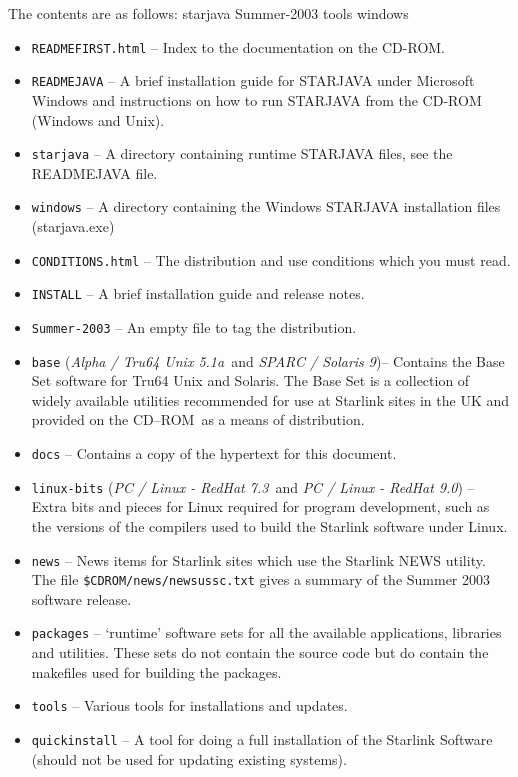\documentclass[twoside,11pt]{article}
\renewcommand{\_}{\texttt{\symbol{95}}}
\newcommand{\cdrom}{CD--ROM}
\newcommand{\cdrom}{CD-ROM}
\newcommand{\axp}{\textit{Alpha / Tru64 Unix 5.1a}}
\newcommand{\rha}{\textit{PC / Linux - RedHat 7.3}}
\newcommand{\rhb}{\textit{PC / Linux - RedHat 9.0}}
\newcommand{\sol}{\textit{SPARC / Solaris 9}}
\begin{document}
The contents are as follows:
starjava  Summer-2003  tools  windows
\begin{itemize}

\item \texttt{README\_FIRST.html} -- Index to the documentation on the CD-ROM.

\item \texttt{README\_JAVA} -- A brief installation guide for STARJAVA under
                               Microsoft Windows and instructions on how to
                               run STARJAVA from the CD-ROM (Windows and Unix).

\item \texttt{starjava} -- A directory containing runtime STARJAVA files, see 
                           the README\_JAVA file.

\item \texttt{windows} -- A directory containing the Windows STARJAVA installation 
                          files (starjava.exe) 

\item \texttt{CONDITIONS.html} -- The distribution and use conditions which
you must read.

\item \texttt{INSTALL} -- A brief installation guide and release notes.

\item \texttt{Summer-2003} -- An empty file to tag the distribution.

\item \texttt{base} (\axp\ and \sol)-- Contains the Base Set software
for Tru64 Unix and Solaris.  The Base Set is a collection of widely
available utilities recommended for use at Starlink sites in the UK and
provided on the \cdrom\ as a means of distribution.

\item \texttt{docs} -- Contains a copy of the hypertext for this document.

\item \texttt{linux-bits} (\rha\ and \rhb) -- Extra bits and pieces
for Linux required for program development, such as the versions of the
compilers used to build the Starlink software under Linux.

\item \texttt{news} -- News items for Starlink sites which use the
Starlink NEWS utility.  The file \texttt{\$CDROM/news/news\_ussc.txt}
gives a summary of the Summer 2003 software release.

\item \texttt{packages} -- `runtime' software sets for all the
available applications, libraries and utilities.  These sets do not
contain the source code but do contain the makefiles used for building
the packages.

\item \texttt{tools} -- Various tools for installations and updates.


\item \texttt{quick\_install} -- A tool for doing a full installation of the 
Starlink Software (should not be used for updating existing systems). 

\end{itemize}
\end{document}
